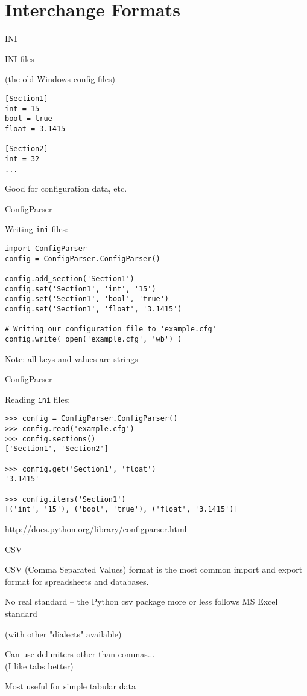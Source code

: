 \documentclass{beamer}
\begin{document}
\section{Interchange Formats} 


\begin{frame}[fragile]{INI}

{\Large INI files}

(the old Windows config files)

\begin{verbatim}
[Section1]
int = 15
bool = true
float = 3.1415

[Section2]
int = 32
...
\end{verbatim}
\vfill
{\Large Good for configuration data, etc.}
\end{frame}

\begin{frame}[fragile]{ConfigParser}

{\Large Writing \verb|ini| files:}

\begin{verbatim}
import ConfigParser
config = ConfigParser.ConfigParser()

config.add_section('Section1')
config.set('Section1', 'int', '15')
config.set('Section1', 'bool', 'true')
config.set('Section1', 'float', '3.1415')

# Writing our configuration file to 'example.cfg'
config.write( open('example.cfg', 'wb') )
\end{verbatim}

\vfill
Note: all keys and values are strings
\end{frame}

\begin{frame}[fragile]{ConfigParser}

{\Large Reading \verb|ini| files:}

\begin{verbatim}
>>> config = ConfigParser.ConfigParser()
>>> config.read('example.cfg')
>>> config.sections()
['Section1', 'Section2']

>>> config.get('Section1', 'float')
'3.1415'

>>> config.items('Section1')
[('int', '15'), ('bool', 'true'), ('float', '3.1415')]
\end{verbatim}

\vfill
\url{http://docs.python.org/library/configparser.html}
\end{frame}

\begin{frame}[fragile]{CSV}

{\Large CSV (Comma Separated Values) format is the
most common import and export format for spreadsheets and databases.}

\vfill
{\Large No real standard -- the Python csv package more or less follows MS Excel standard}

(with other "dialects" available)

\vfill
{\Large Can use delimiters other than commas...}\\
(I like tabs better)

\vfill
{\Large Most useful for simple tabular data}

\end{frame}
\end{document}
